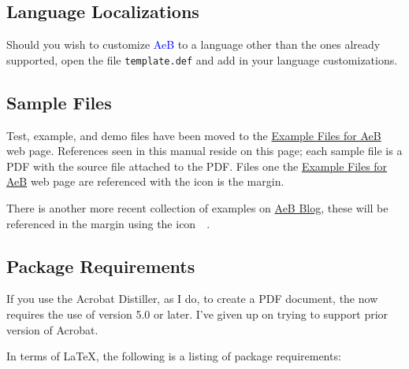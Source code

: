 \documentclass{article}
\def\AcroT{Acro\!\TeX}\def\cAcroT{\textcolor{blue}{\AcroT}}
\def\AEB{\textsf{AeB}}
\def\cAEB{\textcolor{blue}{\AEB}}
\def\bUrl{http://www.math.uakron.edu/~dpstory}
\def\dps{$\mbox{$\mathfrak D$\kern-.3em\mbox{$\mathfrak P$}%
   \kern-.6em \hbox{$\mathcal S$}}$}
\newcommand{\exPDF}[2][\bUrl/webeq_ex.html\#]{\par\ifdim\lastskip>0pt\relax\vskip-\lastskip\fi
\vskip\medskipamount\noindent\makebox[0pt][r]
    {\raisebox{-2pt}{\color{red}\href{#1#2}{{\zqacr
    b\hspace{9.5pt}}}}\enspace}\ignorespaces}
\begin{document}
\subsection{Language Localizations}

Should you wish to customize {\cAEB} to a language other than the ones
already supported, open the file \texttt{template.def} and add in your
language customizations.



\subsection{Sample Files}\label{s:samplefiles}

Test, example, and demo files have been moved to the \href{\bUrl/webeq_ex.html}{Example Files for
AeB} web page. References seen in this manual reside on this page; each
sample file is a PDF with the source file attached to the PDF. Files one
the \href{\bUrl/webeq_ex.html}{Example Files for AeB} web page are
referenced with the icon  is the margin.

There is another more recent collection of examples on \href{\bUrl/aebblog.html}{AeB
Blog}, these will be referenced in the margin using the icon %
\mbox{%
    }\,.


\subsection{Package Requirements}

If you use the Acrobat Distiller, as I do, to create a PDF document, the {\cAcroB}
now requires the use of version 5.0 or later. I've given up on trying to support
prior version of Acrobat.

\newtopic In terms of \LaTeX, the following is a listing of package requirements:
\end{document}
